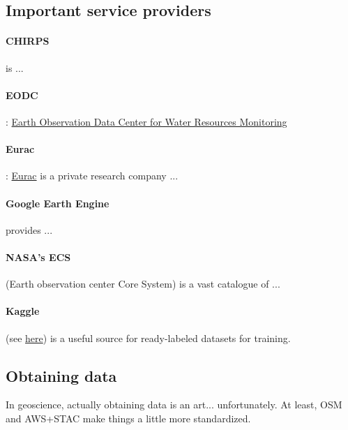 \subsection{Important service providers}
\paragraph{CHIRPS} is ...

\paragraph{EODC}: \href{https://www.eodc.eu/}{Earth Observation Data Center for Water Resources Monitoring}

\paragraph{Eurac}: \href{http://www.eurac.edu}{Eurac} is a private research company ...

\paragraph{Google Earth Engine} provides ...

\paragraph{NASA's ECS} (Earth observation center Core System) is a vast catalogue of ...

\paragraph{Kaggle} (see \href{https://www.kaggle.com/search?q=sentinel}{here}) is a useful source for ready-labeled datasets for training.


\subsection{Obtaining data}
In geoscience, actually obtaining data is an art... unfortunately. At least, OSM and AWS+STAC make things a little more standardized.

